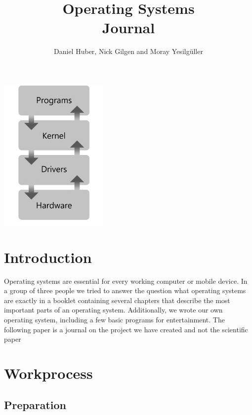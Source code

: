\documentclass{article}
\title{%
	Operating Systems \\
	\large Journal
	}
\author{Daniel Huber, Nick Gilgen and Moray Yesilgüller}
\begin{document}
\maketitle

\vspace*{\fill}

\includegraphics[width=200px]{ostp}

\bigskip
\bigskip
\bigskip
\bigskip

\newpage

\tableofcontents


\section{Introduction}

Operating systems are essential for every working computer or mobile device. In a group of three people we tried to answer the question what operating 
systems are exactly in a booklet containing several chapters that describe the most important parts of an operating system. Additionally, we wrote our own 
operating system, including a few basic programs for entertainment. The following paper is a journal on the project we have created
and not the scientific paper

\section{Workprocess}

\subsection{Preparation}
\end{document}
